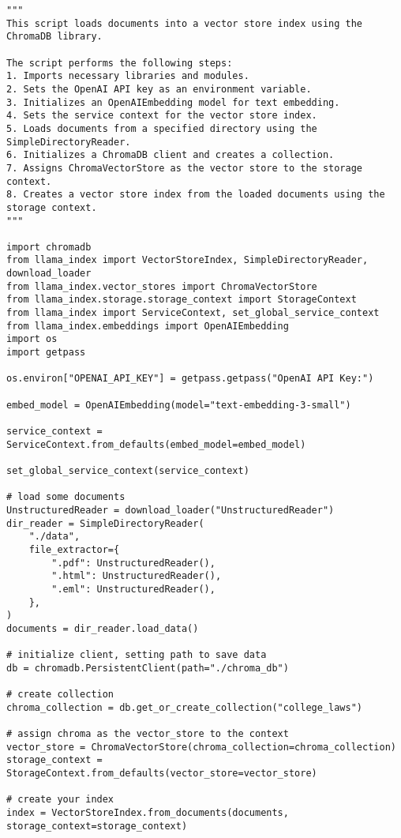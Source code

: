 \begin{Verbatim}[breaklines=true, breakanywhere=true]
"""
This script loads documents into a vector store index using the ChromaDB library.

The script performs the following steps:
1. Imports necessary libraries and modules.
2. Sets the OpenAI API key as an environment variable.
3. Initializes an OpenAIEmbedding model for text embedding.
4. Sets the service context for the vector store index.
5. Loads documents from a specified directory using the SimpleDirectoryReader.
6. Initializes a ChromaDB client and creates a collection.
7. Assigns ChromaVectorStore as the vector store to the storage context.
8. Creates a vector store index from the loaded documents using the storage context.
"""

import chromadb
from llama_index import VectorStoreIndex, SimpleDirectoryReader, download_loader
from llama_index.vector_stores import ChromaVectorStore
from llama_index.storage.storage_context import StorageContext
from llama_index import ServiceContext, set_global_service_context
from llama_index.embeddings import OpenAIEmbedding
import os
import getpass

os.environ["OPENAI_API_KEY"] = getpass.getpass("OpenAI API Key:")

embed_model = OpenAIEmbedding(model="text-embedding-3-small")

service_context = ServiceContext.from_defaults(embed_model=embed_model)

set_global_service_context(service_context)

# load some documents
UnstructuredReader = download_loader("UnstructuredReader")
dir_reader = SimpleDirectoryReader(
    "./data",
    file_extractor={
        ".pdf": UnstructuredReader(),
        ".html": UnstructuredReader(),
        ".eml": UnstructuredReader(),
    },
)
documents = dir_reader.load_data()

# initialize client, setting path to save data
db = chromadb.PersistentClient(path="./chroma_db")

# create collection
chroma_collection = db.get_or_create_collection("college_laws")

# assign chroma as the vector_store to the context
vector_store = ChromaVectorStore(chroma_collection=chroma_collection)
storage_context = StorageContext.from_defaults(vector_store=vector_store)

# create your index
index = VectorStoreIndex.from_documents(documents, storage_context=storage_context)
\end{Verbatim}

